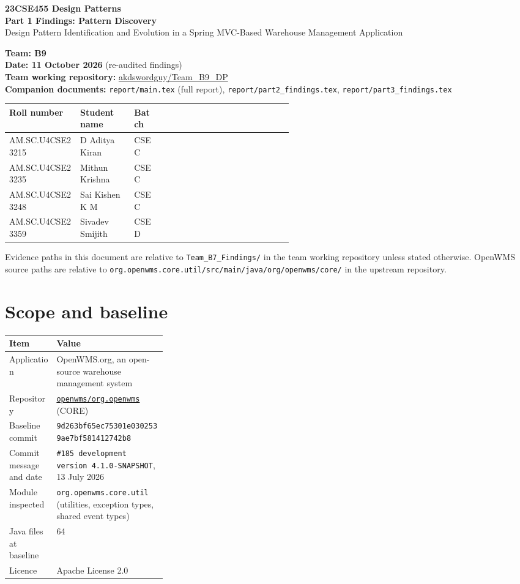 \documentclass[11pt,a4paper]{article}
\title{}
\author{}
\date{}
\newcommand{\code}[1]{\nolinkurl{#1}}
\begin{document}
\begin{center}
{\Large\textbf{23CSE455 Design Patterns}}\\[4pt]
{\LARGE\textbf{Part 1 Findings: Pattern Discovery}}\\[6pt]
{\large Design Pattern Identification and Evolution in a Spring MVC-Based Warehouse Management Application}
\end{center}

\textbf{Team: B9}\\
\textbf{Date: 11 October 2026} (re-audited findings)\\
\textbf{Team working repository:} \href{https://github.com/akdswordguy/Team_B9_DP}{akdswordguy/Team\_B9\_DP}\\
\textbf{Companion documents:} \code{report/main.tex} (full report), \code{report/part2_findings.tex}, \code{report/part3_findings.tex}


\begin{tabularx}{\linewidth}{@{}P{0.25\linewidth}P{0.19\linewidth}P{0.10\linewidth}X@{}}
\toprule
Roll number & Student name & Batch \\
\midrule
AM.SC.U4CSE23215 & D Aditya Kiran & CSE C \\
AM.SC.U4CSE23235 & Mithun Krishna & CSE C \\
AM.SC.U4CSE23248 & Sai Kishen K M & CSE C\\
AM.SC.U4CSE23359 & Sivadev Smijith & CSE D \\
\bottomrule
\end{tabularx}

Evidence paths in this document are relative to \code{Team_B7_Findings/} in the team working repository unless stated otherwise. OpenWMS source paths are relative to \code{org.openwms.core.util/src/main/java/org/openwms/core/} in the upstream repository.

\section{Scope and baseline}

\begin{tabularx}{\linewidth}{@{}P{0.30\linewidth}Y@{}}
\toprule
Item & Value\\
\midrule
Application & OpenWMS.org, an open-source warehouse management system\\
Repository & \href{https://github.com/openwms/org.openwms}{\nolinkurl{openwms/org.openwms}} (CORE)\\
Baseline commit & \code{9d263bf65ec75301e0302539ae7bf581412742b8}\\
Commit message and date & \texttt{\#185 development version 4.1.0-SNAPSHOT}, 13 July 2026\\
Module inspected & \code{org.openwms.core.util} (utilities, exception types, shared event types)\\
Java files at baseline & 64\\
Licence & Apache License 2.0\\
\bottomrule
\end{tabularx}
\end{document}
